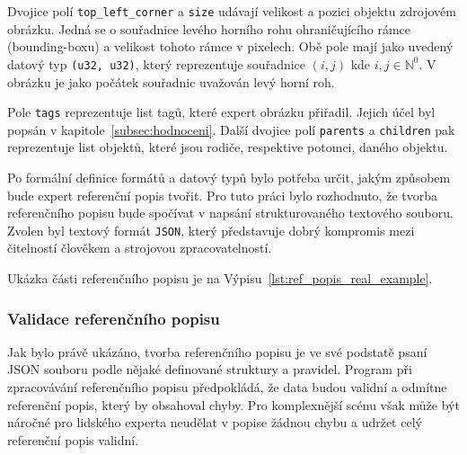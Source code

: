 Dvojice polí \texttt{top\_left\_corner} a \texttt{size} udávají velikost a pozici objektu zdrojovém obrázku.
Jedná se o souřadnice levého horního rohu ohraničujícího rámce (bounding-boxu) a velikost tohoto rámce v pixelech.
Obě pole mají jako uvedený datový typ \texttt{(u32, u32)}, který reprezentuje souřadnice $(i, j)$ kde $i,j \in \mathbb{N}^{0}$.
V obrázku je jako počátek souřadnic uvažován levý horní roh.

Pole \texttt{tags} reprezentuje list tagů, které expert obrázku přiřadil.
Jejich účel byl popsán v kapitole~\ref{subsec:hodnoceni}.
Další dvojice polí \texttt{parents} a \texttt{children} pak reprezentuje list objektů, které jsou rodiče, respektive potomci, daného objektu.

Po formální definice formátů a datový typů bylo potřeba určit, jakým způsobem bude expert referenční popis tvořit.
Pro tuto práci bylo rozhodnuto, že tvorba referenčního popisu bude spočívat v napsání strukturovaného textového souboru.
Zvolen byl textový formát \texttt{JSON}, který představuje dobrý kompromis mezi čitelností člověkem a strojovou zpracovatelností.

Ukázka části referenčního popisu je na Výpisu~\ref{lst:ref_popis_real_example}.


\subsubsection{Validace referenčního popisu}
Jak bylo právě ukázáno, tvorba referenčního popisu je ve své podstatě psaní JSON souboru podle nějaké definované struktury a pravidel.
Program při zpracovávání referenčního popisu předpokládá, že data budou validní a odmítne referenční popis, který by obsahoval chyby.
Pro komplexnější scénu však může být náročné pro lidského experta neudělat v popise žádnou chybu a udržet celý referenční popis validní.

